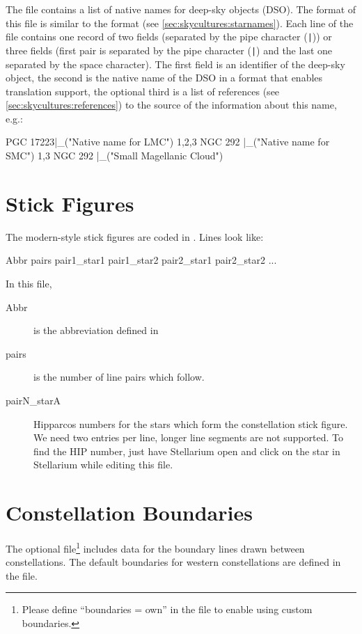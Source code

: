 \noindent{}The file  contains a list of native names for
deep-sky objects (DSO). The format of this file is similar to the 
 format (see \ref{sec:skycultures:starnames}).
Each line of the file contains one record of two fields (separated 
by the pipe character (\texttt{|})) or three fields (first pair is 
separated by the pipe character (\texttt{|}) and the last one separated 
by the space character). The first field is an identifier of the
deep-sky object, the second is the native name of the DSO in a 
format that enables translation support, the optional third is a  
list of references (see \ref{sec:skycultures:references}) to the source 
of the information about this name, e.g.:
\begin{configfile}
PGC 17223|_("Native name for LMC") 1,2,3
NGC 292  |_("Native name for SMC") 1,3
NGC 292  |_("Small Magellanic Cloud")
\end{configfile}

\section{Stick Figures}
\label{sec:skycultures:stickfigures}

The modern-style stick figures are coded in . Lines
look like:

\begin{configfile}
Abbr pairs pair1_star1 pair1_star2 pair2_star1 pair2_star2 ...
\end{configfile}
In this file,
\begin{description}
\item[Abbr] is the abbreviation defined in 
\item[pairs] is the number of line pairs which follow.
\item[pairN\_starA] Hipparcos numbers for the stars which form the
  constellation stick figure. We need two entries per line, longer
  line segments are not supported. To find the HIP number, just have
  Stellarium open and click on the star in Stellarium while editing
  this file.
\end{description}

\section{Constellation Boundaries}
\label{sec:skycultures:boundaries}

The optional file\footnote{Please define ``boundaries = own'' in the file  to enable using custom boundaries.}  includes data for the boundary lines drawn between constellations. The default boundaries for western constellations are defined in the  file.

